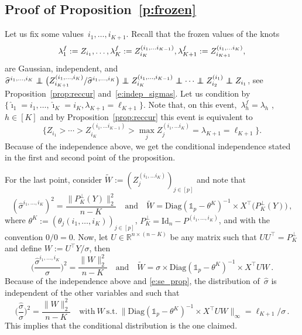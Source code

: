 \documentclass[final,numbib]{imaiai}%
\numberwithin{equation}{section}
\def\eq{\begin{equation}}
\def\qe{\end{equation}}
\renewcommand{\hat}{\widehat}
\renewcommand{\tilde}{\widetilde}
\newcommand\indep{\protect\mathpalette{\protect\independenT}{\perp}}
\def\independenT#1#2{\mathrel{\rlap{$#1#2$}\mkern2mu{#1#2}}}
\newcommand{\<}{\langle}
\renewcommand{\>}{\rangle}
\newcommand{\1}{\mathds{1}}
\begin{document}
{\subsection{Proof of Proposition~\ref{p:frozen}}
  \label{proof:frozen}
 Let us fix some values~$i_1, \ldots, i_{K+1}$. Recall  that the frozen values of the knots
\eq
\notag
 \lambda^f_1 : = Z_{i_1}, \ldots , \lambda^f_{K} :=Z^{(i_1,\ldots i_{K-1})}_{i_{K}},\lambda^f_{K+1} :=   Z^{(i_1,\ldots i_K)}_{i_{K+1}},
  \qe
  are Gaussian, independent, and 
 $
\hat \sigma^{i_1,\ldots, i_{K}}
\indep \big(Z_{i_{K+1}}^{(i_1,\ldots, i_{K})}/\hat \sigma^{i_1,\ldots, i_{K}}\big)
\indep Z_{i_{K}}^{(i_1,\ldots, i_{K-1})}
\indep \cdots 
\indep Z_{i_{2}}^{(i_1)}
\indep Z_{i_1}
$, see Proposition~\ref{prop:reccur} and~\eqref{e:indep_sigmas}. Let us condition by~$\{\hat\imath_1=i_1,\ldots, \hat \imath_K=i_K, \lambda_{K+1} = \ell_{K+1}\}$. Note that, on this event,~$ \lambda_h^f = \lambda_h$ ,~$h \in [K]$ and by Proposition~\ref{prop:reccur} this event is equivalent  to 
 \eq
 \label{e:se_prop}
\{ Z_{i_1}>\cdots >Z^{(i_1,\ldots i_{K-1})}_{i_{K}}> \max_j Z^{(i_1,\ldots i_K)}_{j}=\lambda_{K+1} = \ell_{K+1} \}.
\qe 
Because of the independence above, we get the conditional independence stated in the first and second point of the proposition. 

\noindent
For the last point, consider $\tilde W:=(Z^{(i_1,\ldots i_K)}_{j})_{j\in[p]}$ and note that 
\[
(\hat \sigma^{i_1,\ldots, i_{K}})^2=\frac{\|P_K^\perp(Y)\|_2^2}{n-K}
\quad\mathrm{and}\quad
\tilde W=\mathrm{Diag}(\mathds{1}_p-\theta^K)^{-1}\times X^\top\big(P_K^\perp(Y)\big)\,,
\]
where $\theta^K:=(\theta_{j}(i_1,\ldots, i_K))_{j\in[p]}$, $P_K^\perp=\mathrm{Id}_n-P^{(i_1,\ldots, i_K)}$, and with the convention $0/0=0$. Now, let $U\in\mathds R^{n\times (n-K)}$ be any matrix such that $UU^\top=P_K^\perp$ and define $W:=U^\top Y/\sigma$, then 
\[
\Big(\frac{\hat \sigma^{i_1,\ldots, i_{K}}}{\sigma}\Big)^2=\frac{\|W\|_2^2}{n-K}
\quad\mathrm{and}\quad
\tilde W=\sigma\times\mathrm{Diag}(\mathds{1}_p-\theta^K)^{-1}\times X^\top UW\,.
\]
Because of the independence above and \eqref{e:se_prop}, the distribution of~$\hat \sigma$ is independent of the other variables and such that 
\[
\Big(\frac{\hat \sigma}{\sigma}\Big)^2=\frac{\|W\|_2^2}{n-K}\quad\mathrm{with\ }W\mathrm{\ s.t.\ }\|\mathrm{Diag}(\mathds{1}_p-\theta^K)^{-1}\times X^\top UW\|_\infty=\ell_{K+1}/\sigma\,.
\]
This implies that the conditional distribution is the one claimed.


}
\end{document}
